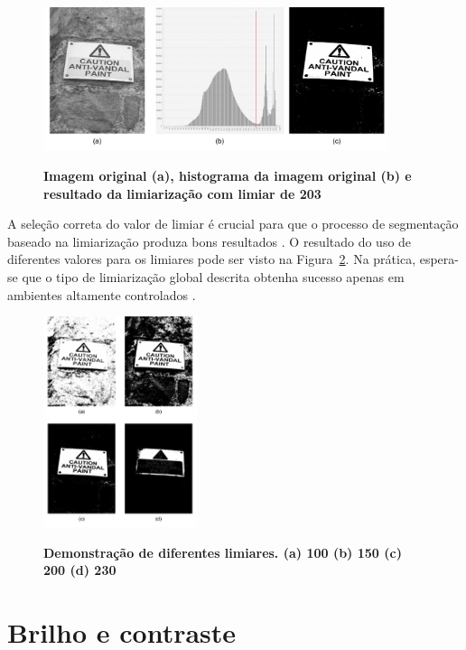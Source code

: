 \documentclass[12pt,oneside,a4paper,english,french,spanish,brazil,]{abntex2}
\begin{document}
\begin{figure}[ht]
\centering
\caption{\textbf{ Imagem original (a), histograma da imagem original (b) e resultado da limiarização com limiar de 203}}
\includegraphics[width=0.9\textwidth]{imagens/PDI_Limiarizacao.pdf}
\sourceAuthor
\label{fig:PDI_Limiarizacao}
\end{figure}

A seleção correta do valor de limiar é crucial para que o processo de segmentação baseado na limiarização produza bons resultados \cite{pedrini:2008}. O resultado do uso de diferentes valores para os limiares pode ser visto na Figura~\ref{fig:PDI_Limiarizacao_2}. Na prática, espera-se que o tipo de limiarização global descrita obtenha sucesso apenas em ambientes altamente controlados \cite{gonzalez:2012}.

\begin{figure}[ht]
\centering
\caption{\textbf{Demonstração de diferentes limiares. (a) 100 (b) 150 (c) 200 (d) 230}}
\includegraphics[width=0.4\textwidth]{imagens/PDI_Limiarizacao_2.pdf}
\sourceAuthor
\label{fig:PDI_Limiarizacao_2}
\end{figure}

\section{Brilho e contraste}
\end{document}
